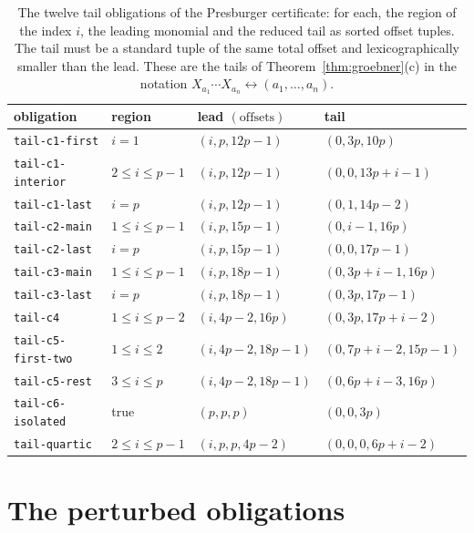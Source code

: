 \documentclass[11pt]{article}
\theoremstyle{definition}
\theoremstyle{remark}
\begin{document}
\begin{table}[ht]
\centering
\small
\begin{tabular}{@{}llll@{}}
\toprule
obligation & region & lead $(\text{offsets})$ & tail\\
\midrule
\texttt{tail-c1-first} & $i=1$ & $(i,p,12p-1)$ & $(0,3p,10p)$\\
\texttt{tail-c1-interior} & $2\leq i\leq p-1$ & $(i,p,12p-1)$ & $(0,0,13p+i-1)$\\
\texttt{tail-c1-last} & $i=p$ & $(i,p,12p-1)$ & $(0,1,14p-2)$\\
\texttt{tail-c2-main} & $1\leq i\leq p-1$ & $(i,p,15p-1)$ & $(0,i-1,16p)$\\
\texttt{tail-c2-last} & $i=p$ & $(i,p,15p-1)$ & $(0,0,17p-1)$\\
\texttt{tail-c3-main} & $1\leq i\leq p-1$ & $(i,p,18p-1)$ & $(0,3p+i-1,16p)$\\
\texttt{tail-c3-last} & $i=p$ & $(i,p,18p-1)$ & $(0,3p,17p-1)$\\
\texttt{tail-c4} & $1\leq i\leq p-2$ & $(i,4p-2,16p)$ & $(0,3p,17p+i-2)$\\
\texttt{tail-c5-first-two} & $1\leq i\leq2$ & $(i,4p-2,18p-1)$ & $(0,7p+i-2,15p-1)$\\
\texttt{tail-c5-rest} & $3\leq i\leq p$ & $(i,4p-2,18p-1)$ & $(0,6p+i-3,16p)$\\
\texttt{tail-c6-isolated} & true & $(p,p,p)$ & $(0,0,3p)$\\
\texttt{tail-quartic} & $2\leq i\leq p-1$ & $(i,p,p,4p-2)$ & $(0,0,0,6p+i-2)$\\
\bottomrule
\end{tabular}
\caption{The twelve tail obligations of the Presburger certificate: for each, the region of the
index $i$, the leading monomial and the reduced tail as sorted offset tuples. The tail must be a standard
tuple of the same total offset and lexicographically smaller than the lead. These are the tails of
Theorem~\ref{thm:groebner}(c) in the notation $X_{a_1}\cdots X_{a_n}\leftrightarrow(a_1,\ldots,a_n)$.}
\label{tab:tails}
\end{table}

\section{The perturbed obligations}\label{app:controls}
\end{document}
